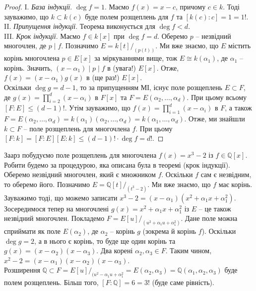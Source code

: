 \documentclass{math_library}
\begin{document}
\begin{proof}
I. \textit{База індукції}. $\deg f = 1$. Маємо $f(x) = x-c$, причому $c \in k$. Тоді зауважимо, що $k \subset k(c)$ буде полем розщеплень для $f$ та $[k(c):c] = 1 = 1!$.\\
II. \textit{Припущення індукції}. Теорема виконується для $\deg f< d$.
\bigskip \\
III. \textit{Крок індукції}. Маємо $f \in k[x]$ при $\deg f = d$. Оберемо $p$ -- незвідний многочлен, де $p \mid f$. Позначимо $E = k[t]/_{(p(t))}$. Ми вже знаємо, що $E$ містить корінь многочлена $p \in E[x]$ за міркуваннями вище, тож $E \cong k(\alpha_1)$, де $\alpha_1$ -- корінь. Значить, $(x-\alpha_1) \mid p \mid f$ в (увага!) $E[x]$. Отже, $f(x) = (x-\alpha_1)g(x)$ в (ще раз!) $E[x]$.\\
Оскільки $\deg g = d-1$, то за припущенням МІ, існує поле розщеплень $E \subset F$, де $g(x) = \displaystyle\prod_{i=2}^d (x-\alpha_i)$ в $F[x]$ та $F = E(\alpha_2,\dots,\alpha_d)$. При цьому всьому $[F:E] \leq (d-1)!$. Утім зауважимо, що $f(x) = \displaystyle\prod_{i=1}^d (x-\alpha_i)$ в $F$, а також $F = E(\alpha_2,\dots,\alpha_d) = k(\alpha_1)(\alpha_2,\dots,\alpha_d) = k(\alpha_1,\dots,\alpha_d)$. Отже, ми знайшли $k \subset F$ -- поле розщеплень для многочлена $f$. При цьому $[F:k] = [F:E][E:k] \leq (d-1)! \cdot \deg f = d!$.
\end{proof}

\begin{example}
Заарз побудуємо поле розщеплень для многочлена $f(x) = x^3 -2$ із $f \in \mathbb{Q}[x]$. Робити будемо за процедурою, яка описана була в теоремі (крок індукції).\\
Оберемо незвідний многочлен, який є множником $f$. Оскільки $f$ сам є незвідним, то оберемо його. Позначимо $E = \mathbb{Q}[t]/_{(t^3-2)}$. Ми вже знаємо, що $f$ має корінь. Зауважимо тоді, що можемо записати $x^3 - 2 = (x-\alpha_1)(x^2+\alpha_1 x + \alpha_1^2)$.\\
Зосередимося тепер на многочлені $g(x) = x^2  +\alpha_1 x + \alpha_1^2$ із $E$ -- це також незвідний многочлен. Покладемо $F = E[u]/_{(u^2 + \alpha_1 u + \alpha_1^2)}$. Дане поле можна сприймати як поле $E(\alpha_2)$, де $\alpha_2$ -- корінь $g$ (зокрема й корінь $f$). Оскільки $\deg g = 2$, а в нього є корінь, то буде ще один корінь та $g(x) = (x-\alpha_2)(x-\alpha_3)$. Два корені $\alpha_2,\alpha_3 \in F$. Таким чином, $x^2 - 2 = (x-\alpha_1)(x-\alpha_2)(x-\alpha_3)$.\\
Розширення $\mathbb{Q} \subset F = E[u]/_{(u^2-\alpha_1u + \alpha_1^2} = E(\alpha_2,\alpha_3) = \mathbb{Q}(\alpha_1,\alpha_2,\alpha_3)$ буде полем розщеплень. Більш того, $[F:\mathbb{Q}] = 6 = 3!$ (буде саме рівність).
\end{example}
\end{document}
